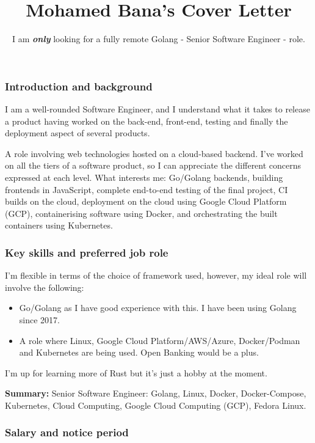 \documentclass[
  a4paper,
]{article}
\title{Mohamed Bana's Cover Letter}
\author{I am \textbf{\emph{only}} looking for a fully remote Golang -
Senior Software Engineer - role.}
\date{}
\providecommand{\tightlist}{%
  \setlength{\itemsep}{0pt}\setlength{\parskip}{0pt}}
\begin{document}
\maketitle

\hypertarget{introduction-and-background}{%
\subsubsection{Introduction and
background}\label{introduction-and-background}}

I am a well-rounded Software Engineer, and I understand what it takes to
release a product having worked on the back-end, front-end, testing and
finally the deployment aspect of several products.

A role involving web technologies hosted on a cloud-based backend. I've
worked on all the tiers of a software product, so I can appreciate the
different concerns expressed at each level. What interests me: Go/Golang
backends, building frontends in JavaScript, complete end-to-end testing
of the final project, CI builds on the cloud, deployment on the cloud
using Google Cloud Platform (GCP), containerising software using Docker,
and orchestrating the built containers using Kubernetes.

\hypertarget{key-skills-and-preferred-job-role}{%
\subsubsection{Key skills and preferred job
role}\label{key-skills-and-preferred-job-role}}

I'm flexible in terms of the choice of framework used, however, my ideal
role will involve the following:

\begin{itemize}
\tightlist
\item
  Go/Golang as I have good experience with this. I have been using
  Golang since 2017.
\item
  A role where Linux, Google Cloud Platform/AWS/Azure, Docker/Podman and
  Kubernetes are being used. Open Banking would be a plus.
\end{itemize}

I'm up for learning more of Rust but it's just a hobby at the moment.

\textbf{Summary:} Senior Software Engineer: Golang, Linux, Docker,
Docker-Compose, Kubernetes, Cloud Computing, Google Cloud Computing
(GCP), Fedora Linux.

\hypertarget{salary-and-notice-period}{%
\subsubsection{Salary and notice
period}\label{salary-and-notice-period}}
\end{document}
